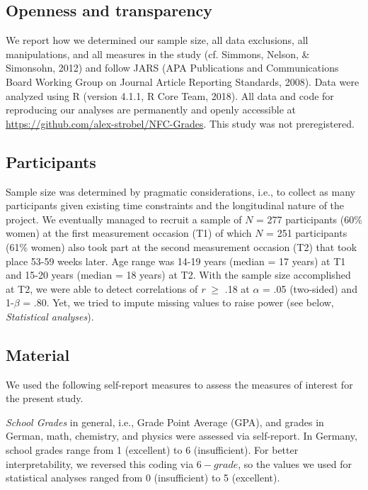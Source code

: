 \documentclass[
  man]{apa6}
\begin{document}
\hypertarget{openness-and-transparency}{%
\subsection{Openness and transparency}\label{openness-and-transparency}}

We report how we determined our sample size, all data exclusions, all manipulations, and all measures in the study (cf. Simmons, Nelson, \& Simonsohn, 2012) and follow JARS (APA Publications and Communications Board Working Group on Journal Article Reporting Standards, 2008).
Data were analyzed using R (version 4.1.1, R Core Team, 2018).
All data and code for reproducing our analyses are permanently and openly accessible at \url{https://github.com/alex-strobel/NFC-Grades}.
This study was not preregistered.

\hypertarget{participants}{%
\subsection{Participants}\label{participants}}

Sample size was determined by pragmatic considerations, i.e., to collect as many participants given existing time constraints and the longitudinal nature of the project.
We eventually managed to recruit a sample of \(N\) = 277 participants (60\% women) at the first measurement occasion (T1) of which \(N\) = 251 participants (61\% women) also took part at the second measurement occasion (T2) that took place 53-59 weeks later.
Age range was 14-19 years (median = 17 years) at T1 and 15-20 years (median = 18 years) at T2.
With the sample size accomplished at T2, we were able to detect correlations of \emph{r} \(\ge\) .18 at \(\alpha\) = .05 (two-sided) and 1-\(\beta\) = .80.
Yet, we tried to impute missing values to raise power (see below, \emph{Statistical analyses}).

\hypertarget{material}{%
\subsection{Material}\label{material}}

We used the following self-report measures to assess the measures of interest for the present study.

\emph{School Grades} in general, i.e., Grade Point Average (GPA), and grades in German, math, chemistry, and physics were assessed via self-report. In Germany, school grades range from 1 (excellent) to 6 (insufficient). For better interpretability, we reversed this coding via \(6 - grade\), so the values we used for statistical analyses ranged from 0 (insufficient) to 5 (excellent).
\end{document}
